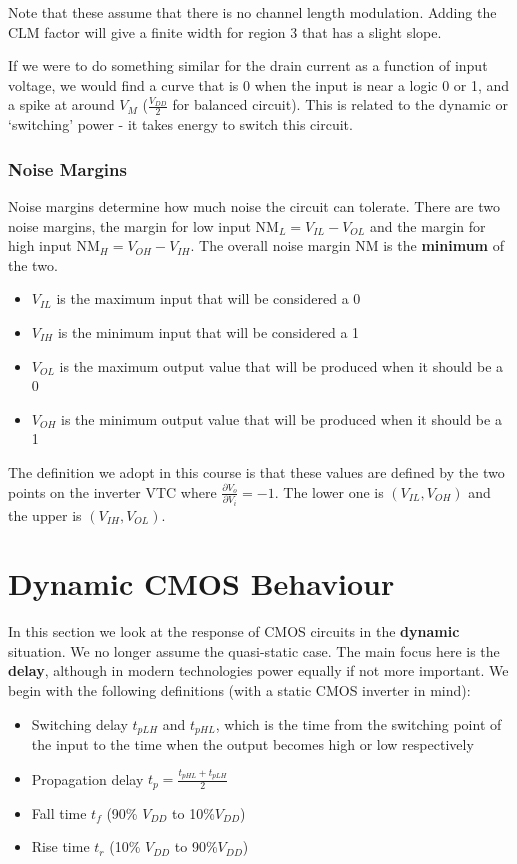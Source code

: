\documentclass[11pt]{report}
\begin{document}
Note that these assume that there is no channel length modulation. Adding the CLM factor will give a finite width for region 3 that has a slight slope.

If we were to do something similar for the drain current as a function of input voltage, we would find a curve that is 0 when the input is near a logic 0 or 1, and a spike at around $V_M$ ($\frac{V_{DD}}{2}$ for balanced circuit). This is related to the dynamic or `switching' power - it takes energy to switch this circuit.

\subsection{Noise Margins}
Noise margins determine how much noise the circuit can tolerate. There are two noise margins, the margin for low input NM$_L = V_{IL} - V_{OL}$ and the margin for high input NM$_H = V_{OH} - V_{IH}$. The overall noise margin NM is the \textbf{minimum} of the two.

\begin{itemize}
	\item $V_{IL}$ is the maximum input that will be considered a 0
	\item $V_{IH}$ is the minimum input that will be considered a 1
	\item $V_{OL}$ is the maximum output value that will be produced when it should be a 0
	\item $V_{OH}$ is the minimum output value that will be produced when it should be a 1
\end{itemize}

The definition we adopt in this course is that these values are defined by the two points on the inverter VTC where $\frac{\partial V_o}{\partial V_i} = -1$. The lower one is $(V_{IL}, V_{OH})$ and the upper is $(V_{IH}, V_{OL})$.

\chapter{Dynamic CMOS Behaviour}
In this section we look at the response of CMOS circuits in the \textbf{dynamic} situation. We no longer assume the quasi-static case. The main focus here is the \textbf{delay}, although in modern technologies power equally if not more important. We begin with the following definitions (with a static CMOS inverter in mind):

\begin{itemize}
	\item Switching delay $t_{pLH}$ and $t_{pHL}$, which is the time from the switching point of the input to the time when the output becomes high or low respectively
	\item Propagation delay $t_p = \frac{t_{pHL} + t_{pLH}}{2}$
	\item Fall time $t_{f}$ (90\% $V_{DD}$ to 10\%$V_{DD}$)
	\item Rise time $t_{r}$ (10\% $V_{DD}$ to 90\%$V_{DD}$)
\end{itemize}
\end{document}
